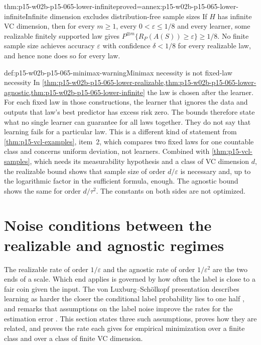 \begin{hbcorollary}{thm:p15-w02b-p15-065-lower-infinite}{proved=annex:p15-w02b-p15-065-lower-infinite}{Infinite dimension excludes distribution-free sample sizes}
If \(H\) has infinite VC dimension, then for every \(m\geq1\), every
\(0<\varepsilon\leq1/8\) and every learner, some realizable finitely
supported law gives \(P^{\otimes m}\{R_P(A(S))\geq\varepsilon\}\geq1/8\).
No finite sample size achieves accuracy \(\varepsilon\) with confidence
\(\delta<1/8\) for every realizable law, and hence none does so for every
law.
\end{hbcorollary}

\begin{hbwarning}{def:p15-w02b-p15-065-minimax-warning}{Minimax necessity is not fixed-law necessity}
In \cref{thm:p15-w02b-p15-065-lower-realizable,thm:p15-w02b-p15-065-lower-agnostic,thm:p15-w02b-p15-065-lower-infinite}
the law is chosen after the learner. For each fixed law in those
constructions, the learner that ignores the data and outputs that law's
best predictor has excess risk zero. The bounds therefore state what no
single learner can guarantee for all laws together. They do not say that
learning fails for a particular law. This is a different kind of statement
from \cref{thm:p15-vcl-examples}, item~2, which compares two fixed laws
for one countable class and concerns uniform deviation, not learners.
Combined with \cref{thm:p15-vcl-samples}, which needs its measurability
hypothesis and a class of VC dimension \(d\), the realizable bound shows
that sample size of order \(d/\varepsilon\) is necessary and, up to the
logarithmic factor in the sufficient formula, enough. The agnostic bound
shows the same for order \(d/\tau^2\). The constants on both sides are not
optimized.
\end{hbwarning}

\section{Noise conditions between the realizable and agnostic regimes}
\label{sec:p15-w02b-p15-065-noise-conditions}

The realizable rate of order \(1/\varepsilon\) and the agnostic rate of
order \(1/\varepsilon^2\) are the two ends of a scale. Which end applies is
governed by how often the label is close to a fair coin given the input.
The von Luxburg--Sch\"olkopf presentation describes learning as harder the
closer the conditional label probability lies to one half
\cite[Section~2.2, p.~3]{LuxburgScholkopf2008Author}, and remarks that
assumptions on the label noise improve the rates for the estimation error
\cite[Section~7.4, p.~29]{LuxburgScholkopf2008Author}. This section states
three such assumptions, proves how they are related, and proves the rate
each gives for empirical minimization over a finite class and over a class
of finite VC dimension.

